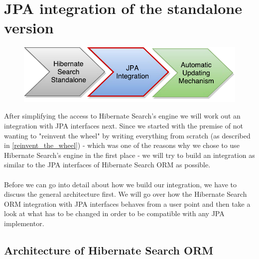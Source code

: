 \section{JPA integration of the standalone version} \label{integration_jpa}

\begin{figure}[ht]
	\centering
	\includegraphics[scale=0.75]{images/timeline_genericjpa_second.pdf}
	\label{project_timeline_second}
\end{figure}
\noindent
After simplifying the access to Hibernate Search's engine we will work out an integration with JPA interfaces next. Since we started with the premise of not wanting to "reinvent the wheel" by writing everything from scratch (as described in \ref{reinvent_the_wheel}) - which was one of the reasons why we chose to use Hibernate Search's engine in the first place - we will try to build an integration as similar to the JPA interfaces of Hibernate Search ORM as possible.
\\\\
Before we can go into detail about how we build our integration, we have to discuss the general architecture first. We will go over how the Hibernate Search ORM integration with JPA interfaces behaves from a user point and then take a look at what has to be changed in order to be compatible with any JPA implementor.

\pagebreak

\subsection{Architecture of Hibernate Search ORM}

